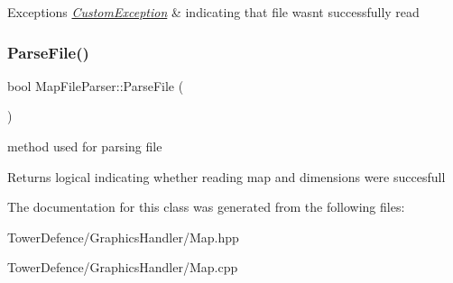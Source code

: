\begin{DoxyExceptions}{Exceptions}
{\em \mbox{\hyperlink{class_custom_exception}{Custom\+Exception}}} & indicating that file wasn\textquotesingle{}t successfully read \\
\hline
\end{DoxyExceptions}
\mbox{\label{class_map_file_parser_a763133f44741dc4164595d03df036d0b}} 
\subsubsection{\texorpdfstring{Parse\+File()}{ParseFile()}}
{\footnotesize\ttfamily bool Map\+File\+Parser\+::\+Parse\+File (\begin{DoxyParamCaption}{ }\end{DoxyParamCaption})}



method used for parsing file 

\begin{DoxyReturn}{Returns}
logical indicating whether reading map and dimensions were succesfull 
\end{DoxyReturn}


The documentation for this class was generated from the following files\+:\begin{DoxyCompactItemize}
\item 
Tower\+Defence/\+Graphics\+Handler/Map.\+hpp\item 
Tower\+Defence/\+Graphics\+Handler/Map.\+cpp\end{DoxyCompactItemize}

